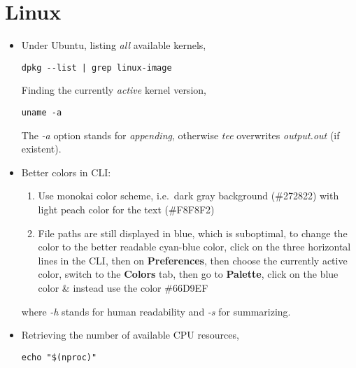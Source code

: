 \documentclass[12pt, a4paper]{article}
\numberwithin{equation}{section}
\theoremstyle{definition}
\theoremstyle{definition}
\begin{document}
	\newpage 
	\section{Linux}
	\begin{itemize}
	
		\item Under Ubuntu, listing \textit{all} available kernels, 
	
		\begin{lstlisting}[style=mystylebash, label=alg:ubuntu_kernel, caption=Find kernel versions in Ubuntu, xleftmargin=\parindent]
			dpkg --list | grep linux-image
		\end{lstlisting}

		Finding the currently \textit{active} kernel version,
		\begin{lstlisting}[style=mystylebash, label=alg:ubuntu_kernel__current, caption=Current kerel versions in Ubuntu, xleftmargin=\parindent]
			uname -a
		\end{lstlisting}
	
		The \textit{-a} option stands for \textit{appending}, otherwise \textit{tee} overwrites \textit{output.out} (if existent). 

		\item Better colors in CLI: 
		
		\begin{enumerate}
			\item Use monokai color scheme, i.e.~dark gray background (\#272822) with light peach color for the text (\#F8F8F2)
			\item File paths are still displayed in blue, which is suboptimal, to change the color to the better readable cyan-blue color, click on the three horizontal lines in the CLI, then on \textbf{Preferences}, then choose the currently active color, switch to the \textbf{Colors} tab, then go to \textbf{Palette}, click on the blue color \& instead use the color \#66D9EF
		\end{enumerate}
	
		where \textit{-h} stands for human readability and \textit{-s} for summarizing. 
		
		\item Retrieving the number of available CPU resources,
		
		\begin{lstlisting}[style=mystylebash, label=alg:bash__cpu_res, xleftmargin=\parindent]
			echo "$(nproc)"
		\end{lstlisting}
		

\end{itemize}
\end{document}
